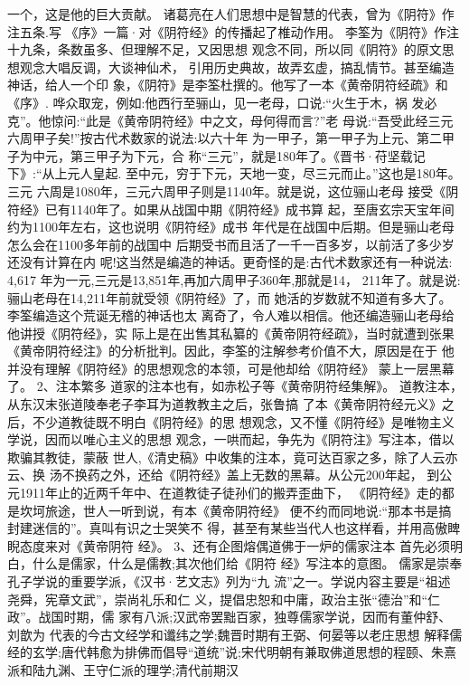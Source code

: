 \documentclass[12pt,UTF8]{ctexbook}
\begin{document}
一个，这是他的巨大贡献。
诸葛亮在人们思想中是智慧的代表，曾为《阴符》作注五条.写
《序》一篇·对《阴符经》的传播起了椎动作用。
李筌为《阴符》作注十九条，条数虽多、但理解不足，又因思想
观念不同，所以同《阴符》的原文思想观念大唱反调，大谈神仙术，
引用历史典故，故弄玄虚，搞乱情节。甚至编造神话，给人一个印
象，《阴符》是李筌杜撰的。他写了一本《黄帝阴符经疏》和《序》.
哗众取宠，例如:他西行至骊山，见一老母，口说:“火生于木，祸
发必克”。他惊问:“此是《黄帝阴符经》中之文，母何得而言?”老
母说:“吾受此经三元六周甲子矣!”按古代术数家的说法:以六十年
为一甲子，第一甲子为上元、第二甲子为中元，第三甲子为下元，合
称“三元”，就是180年了。《晋书·苻坚载记下》:“从上元人皇起.
至中元，穷于下元，天地一变，尽三元而止。”这也是180年。三元
六周是1080年，三元六周甲子则是1140年。就是说，这位骊山老母
接受《阴符经》已有1140年了。如果从战国中期《阴符经》成书算
起，至唐玄宗天宝年间约为1100年左右，这也说明《阴符经》成书
年代是在战国中后期。但是骊山老母怎么会在1100多年前的战国中
后期受书而且活了一千一百多岁，以前活了多少岁还没有计算在内
呢!这当然是编造的神话。更奇怪的是:古代术数家还有一种说法:
4,617 年为一元,三元是13,851年,再加六周甲子360年,那就是14，
211年了。就是说:骊山老母在14,211年前就受领《阴符经》了，而
她活的岁数就不知道有多大了。李筌编造这个荒诞无稽的神话也太
离奇了，令人难以相信。他还编造骊山老母给他讲授《阴符经》，实
际上是在出售其私纂的《黄帝阴符经疏》，当时就遭到张果《黄帝阴符经注》的分析批判。因此，李筌的注解参考价值不大，原因是在于
他并没有理解《阴符经》的思想观念的本领，可是他却给《阴符经》
蒙上一层黑幕了。
2、注本繁多
道家的注本也有，如赤松子等《黄帝阴符经集解》。
道教注本，从东汉末张道陵奉老子李耳为道教教主之后，张鲁搞
了本《黄帝阴符经元义》之后，不少道教徒既不明白《阴符经》的思
想观念，又不懂《阴符经》是唯物主义学说，因而以唯心主义的思想
观念，一哄而起，争先为《阴符注》写注本，借以欺骗其教徒，蒙蔽
世人,《清史稿》中收集的注本，竟可达百家之多，除了人云亦云、换
汤不换药之外，还给《阴符经》盖上无数的黑幕。从公元200年起，
到公元1911年止的近两千年中、在道教徒子徒孙们的搬弄歪曲下，
《阴符经》走的都是坎坷旅途，世人一听到说，有本《黄帝阴符经》
便不约而同地说:“那本书是搞封建迷信的”。真叫有识之士哭笑不
得，甚至有某些当代人也这样看，并用高傲睥睨态度来对《黄帝阴符
经》。
3、还有企图熔偶道佛于一炉的儒家注本
首先必须明白，什么是儒家，什么是儒教;其次他们给《阴符
经》写注本的意图。
儒家是崇奉孔子学说的重要学派，《汉书·艺文志》列为“九
流”之一。学说内容主要是“祖述尧舜，宪章文武”，崇尚礼乐和仁
义，提倡忠恕和中庸，政治主张“德治”和“仁政”。战国时期，儒
家有八派;汉武帝罢黜百家，独尊儒家学说，因而有董仲舒、刘歆为
代表的今古文经学和谶纬之学;魏晋时期有王弼、何晏等以老庄思想
解释儒经的玄学;唐代韩愈为排佛而倡导“道统”说;宋代明朝有兼取佛道思想的程颐、朱熹派和陆九渊、王守仁派的理学;清代前期汉
\end{document}
